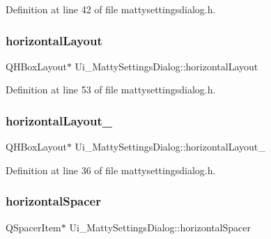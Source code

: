 Definition at line 42 of file mattysettingsdialog.\+h.

\hypertarget{classUi__MattySettingsDialog_ad0cd953caef9152c707b9ea9bffee662}{}\label{classUi__MattySettingsDialog_ad0cd953caef9152c707b9ea9bffee662} 
\subsubsection{\texorpdfstring{horizontal\+Layout}{horizontalLayout}}
{\footnotesize\ttfamily Q\+H\+Box\+Layout$\ast$ Ui\+\_\+\+Matty\+Settings\+Dialog\+::horizontal\+Layout}



Definition at line 53 of file mattysettingsdialog.\+h.

\hypertarget{classUi__MattySettingsDialog_a1375b6bf1c6f67822688dbcffc8348a9}{}\label{classUi__MattySettingsDialog_a1375b6bf1c6f67822688dbcffc8348a9} 
\subsubsection{\texorpdfstring{horizontal\+Layout\+\_}{horizontalLayout\_2}}
{\footnotesize\ttfamily Q\+H\+Box\+Layout$\ast$ Ui\+\_\+\+Matty\+Settings\+Dialog\+::horizontal\+Layout\+\_}



Definition at line 36 of file mattysettingsdialog.\+h.

\hypertarget{classUi__MattySettingsDialog_ad5be2117ab753b5ed616b91faf0ed757}{}\label{classUi__MattySettingsDialog_ad5be2117ab753b5ed616b91faf0ed757} 
\subsubsection{\texorpdfstring{horizontal\+Spacer}{horizontalSpacer}}
{\footnotesize\ttfamily Q\+Spacer\+Item$\ast$ Ui\+\_\+\+Matty\+Settings\+Dialog\+::horizontal\+Spacer}



